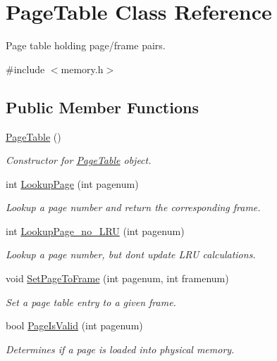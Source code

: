 \hypertarget{classPageTable}{}\section{Page\+Table Class Reference}
\label{classPageTable}


Page table holding page/frame pairs.  




{\ttfamily \#include $<$memory.\+h$>$}

\subsection*{Public Member Functions}
\begin{DoxyCompactItemize}
\item 
\hyperlink{classPageTable_a75c92e794fd3f5397d2499d54dac22c9}{Page\+Table} ()
\begin{DoxyCompactList}\small\item\em Constructor for \hyperlink{classPageTable}{Page\+Table} object. \end{DoxyCompactList}\item 
int \hyperlink{classPageTable_a2590af90445c76b97420da95cf7210ec}{Lookup\+Page} (int pagenum)
\begin{DoxyCompactList}\small\item\em Lookup a page number and return the corresponding frame. \end{DoxyCompactList}\item 
int \hyperlink{classPageTable_a3444b04644cb833bfd2a9b615704e6a1}{Lookup\+Page\+\_\+no\+\_\+\+L\+RU} (int pagenum)
\begin{DoxyCompactList}\small\item\em Lookup a page number, but don\textquotesingle{}t update L\+RU calculations. \end{DoxyCompactList}\item 
void \hyperlink{classPageTable_ac961a37f5dde09c3addce2fcd118f24d}{Set\+Page\+To\+Frame} (int pagenum, int framenum)
\begin{DoxyCompactList}\small\item\em Set a page table entry to a given frame. \end{DoxyCompactList}\item 
bool \hyperlink{classPageTable_ac43e4430873d7760eb7a25cd9a025f8c}{Page\+Is\+Valid} (int pagenum)
\begin{DoxyCompactList}\small\item\em Determines if a page is loaded into physical memory. \end{DoxyCompactList}\item 

\end{DoxyCompactItemize}

